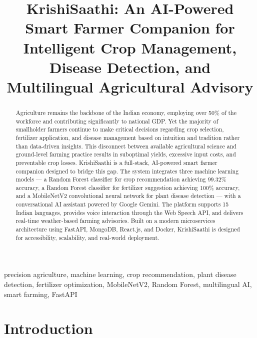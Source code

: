 \documentclass[conference]{IEEEtran}
\begin{document}
\title{KrishiSaathi: An AI-Powered Smart Farmer Companion for Intelligent Crop Management, Disease Detection, and Multilingual Agricultural Advisory}

\author{
}

\maketitle

\begin{abstract}
Agriculture remains the backbone of the Indian economy, employing over 50\% of the workforce and contributing significantly to national GDP. Yet the majority of smallholder farmers continue to make critical decisions regarding crop selection, fertilizer application, and disease management based on intuition and tradition rather than data-driven insights. This disconnect between available agricultural science and ground-level farming practice results in suboptimal yields, excessive input costs, and preventable crop losses. KrishiSaathi is a full-stack, AI-powered smart farmer companion designed to bridge this gap. The system integrates three machine learning models --- a Random Forest classifier for crop recommendation achieving 99.32\% accuracy, a Random Forest classifier for fertilizer suggestion achieving 100\% accuracy, and a MobileNetV2 convolutional neural network for plant disease detection --- with a conversational AI assistant powered by Google Gemini. The platform supports 15 Indian languages, provides voice interaction through the Web Speech API, and delivers real-time weather-based farming advisories. Built on a modern microservices architecture using FastAPI, MongoDB, React.js, and Docker, KrishiSaathi is designed for accessibility, scalability, and real-world deployment.
\end{abstract}

\begin{IEEEkeywords}
precision agriculture, machine learning, crop recommendation, plant disease detection, fertilizer optimization, MobileNetV2, Random Forest, multilingual AI, smart farming, FastAPI
\end{IEEEkeywords}

\section{Introduction}
\end{document}
